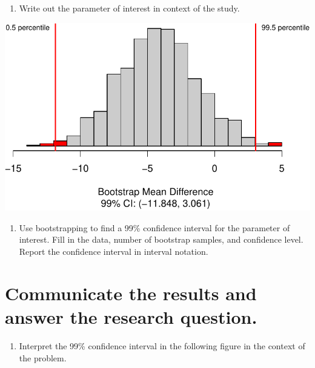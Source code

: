 \documentclass[
]{report}
\providecommand{\tightlist}{%
  \setlength{\itemsep}{0pt}\setlength{\parskip}{0pt}}
\begin{document}
\vspace{1in}

\begin{enumerate}
\def\labelenumi{\arabic{enumi}.}
\setcounter{enumi}{15}
\tightlist
\item
  Write out the parameter of interest in context of the study.
\end{enumerate}

\vspace{1in}

\begin{center}\includegraphics[width=0.7\linewidth]{08-paired_files/figure-latex/unnamed-chunk-5-1} \end{center}

\begin{enumerate}
\def\labelenumi{\arabic{enumi}.}
\setcounter{enumi}{16}
\tightlist
\item
  Use bootstrapping to find a 99\% confidence interval for the parameter of interest. Fill in the data, number of bootstrap samples, and confidence level. Report the confidence interval in interval notation.
\end{enumerate}

\vspace{1in}

\hypertarget{communicate-the-results-and-answer-the-research-question.}{%
\section{Communicate the results and answer the research question.}\label{communicate-the-results-and-answer-the-research-question.}}

\begin{enumerate}
\def\labelenumi{\arabic{enumi}.}
\setcounter{enumi}{17}
\tightlist
\item
  Interpret the 99\% confidence interval in the following figure in the context of the problem.
\end{enumerate}
\end{document}
